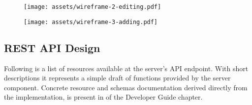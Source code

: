 \begin{figure}[h]{}
\centering\texttt{[image: assets/wireframe-2-editing.pdf]}
\caption{}

\end{figure}

\begin{figure}[h]{}
\centering\texttt{[image: assets/wireframe-3-adding.pdf]}
\caption{}

\end{figure}

\hypertarget{x-rest-api-design}{\subsection*{REST API Design}}
Following is a list of resources available at the server’s API endpoint.
With short descriptions it represents a simple draft of functions provided 
by the server component.
Concrete resource and schemas documentation derived
directly from the implementation, is present
in \hyperlink{./13-developer-guide#server-api}{} of the
Developer Guide chapter.


